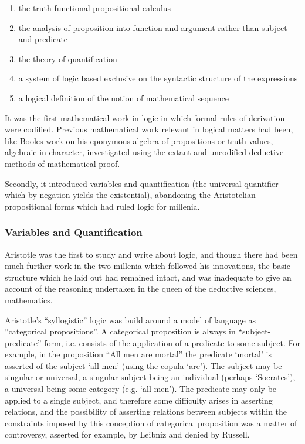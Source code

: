 \documentclass[10pt,titlepage]{article}
\begin{document}
\begin{enumerate}
\item the truth-functional propositional calculus
\item the analysis of proposition into function and argument rather than subject and predicate
\item the theory of quantification
\item a system of logic based exclusive on the syntactic structure of the expressions
  \item a logical definition of the notion of mathematical sequence
  \end{enumerate}


It was the first mathematical work in logic in which formal rules of derivation were codified.
Previous mathematical work relevant in logical matters had been, like Booles work on his eponymous algebra of propositions or truth values, algebraic in character, investigated using the extant and uncodified deductive methods of mathematical proof.

Secondly, it introduced variables and quantification (the universal quantifier which by negation yields the existential), abandoning the Aristotelian propositional forms which had ruled logic for millenia.

\subsubsection{Variables and Quantification}

Aristotle was the first to study and write about logic, and though there had been much further work in the two millenia which followed his innovations, the basic structure which he laid out had remained intact, and was inadequate to give an account of the reasoning undertaken in the queen of the deductive sciences, mathematics.

Aristotle's ``syllogistic'' logic was build around a model of language as ''categorical propositions''.
A categorical proposition is always in ``subject-predicate'' form, i.e. consists of the application of a predicate to some subject.
For example, in the proposition ``All men are mortal'' the predicate `mortal' is asserted of the subject `all men' (using the copula `are').
The subject may be singular or universal, a singular subject being an individual (perhaps `Socrates'), a universal being some category (e.g. `all men').
The predicate may only be applied to a single subject, and therefore some difficulty arises in asserting relations, and the possibility of asserting relations between subjects within the constraints imposed by this conception of categorical proposition was a matter of controversy, asserted for example, by Leibniz and denied by Russell.
\end{document}
